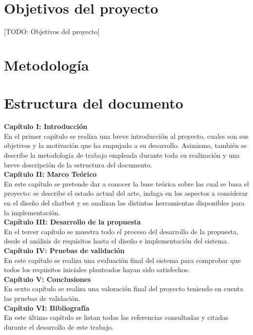 
\section{Objetivos del proyecto}
[TODO: Objetivos del proyecto]

\section{Metodología}


\section{Estructura del documento}
\noindent \textbf{Capítulo I: Introducción}\\
En el primer capítulo se realiza una breve introducción al proyecto, cuales son sus objetivos y la motivación que ha empujado a su desarrollo. Asimismo, también se describe la metodología de trabajo empleada durante toda su realización y una breve descripción de la estructura del documento.  \\

\noindent \textbf{Capítulo II: Marco Teórico}\\
En este capítulo se pretende dar a conocer la base teórica sobre las cual se basa el proyecto: se describe el estado actual del arte, indaga en los aspectos a considerar en el diseño del chatbot y se analizan las distintas herramientas disponibles para la implementación.\\

\noindent \textbf{Capítulo III: Desarrollo de la propuesta}\\
En el tercer capítulo se muestra todo el proceso del desarrollo de la propuesta, desde el análisis de requisitos hasta el diseño e implementación del sistema. \\

\noindent \textbf{Capítulo IV: Pruebas de validación}\\
En este capítulo se realiza una evaluación final del sistema para comprobar que todos los requisitos iniciales planteados hayan sido satisfechos.\\

\noindent \textbf{Capítulo V: Conclusiones}\\
En sexto capítulo se realiza una valoración final del proyecto teniendo en cuenta las pruebas de validación.\\

\noindent \textbf{Capítulo VI: Bibliografía}\\
En este último capítulo se listan todas las referencias consultadas y citadas durante el desarrollo de este trabajo.\\